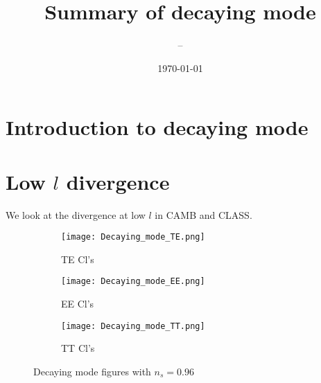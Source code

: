 \documentclass[12pt]{article}
\title{Summary of decaying mode}
\author{--}
\date{ \today}
\numberwithin{equation}{section}
\begin{document}
\setlength{\belowcaptionskip}{2.0 pt}
\setlength{\intextsep}{3.0 pt}

\maketitle

\tableofcontents

\section{Introduction to decaying mode}


\section{Low $l$ divergence}

We look at the divergence at low $l$ in CAMB and CLASS.

\begin{figure}[ht]\centering
        \begin{subfigure}{.5\textwidth}
               \texttt{[image: Decaying\_mode\_TE.png]}
               \caption{TE Cl's}
                \label{fig:P1} 
        \end{subfigure}%
        \begin{subfigure}{.5\textwidth}
                \texttt{[image: Decaying\_mode\_EE.png]}
                \caption{EE Cl's}
                \label{fig:P2}
        \end{subfigure}
	\begin{subfigure}{0.5\textwidth}
                \texttt{[image: Decaying\_mode\_TT.png]}
                \caption{TT Cl's}
                \label{fig:P3}
        \end{subfigure}
       \caption{Decaying mode figures with $n_s = 0.96$} \label{fig:growing mode}
\end{figure}
\end{document}
